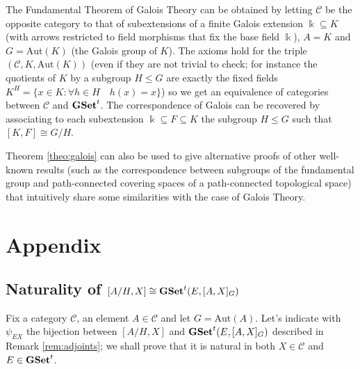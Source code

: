 \documentclass[italian, 12pt, reqno]{article}
\theoremstyle{myteo}
\numberwithin{equation}{section}
\newcommand{\cat}[1]{\mathscr{#1}}
\newcommand{\aut}{\text{Aut}}
\newcommand{\tgset}{\text{\textbf{GSet}}^t}
\newcommand{\homs}[2]{[#1, #2]}
\begin{document}
The Fundamental Theorem of Galois Theory can be obtained by letting \(\cat{C}\) be the opposite category to that of subextensions of a finite Galois extension \(\Bbbk \subseteq K\) (with arrows restricted to field morphisms that fix the base field \(\Bbbk\)), \(A = K\) and \(G = \text{Aut}(K)\) (the Galois group of \(K\)).
The axioms hold for the triple \((\cat{C}, K, \text{Aut}(K))\) (even if they are not trivial to check; for instance the quotients of \(K\) by a subgroup \(H \leq G\) are exactly the fixed fields \(K^H = \{x \in K : \forall h \in H\quad h(x) = x\}\)) so we get an equivalence of categories between \(\cat{C}\) and \(\tgset\).
The correspondence of Galois can be recovered by associating to each subextension \(\Bbbk \subseteq F \subseteq K\) the subgroup \(H \leq G\) such that \([K, F] \cong G/H\).

Theorem \ref{theo:galois} can also be used to give alternative proofs of other well-known results (such as the correspondence between subgroups of the fundamental group and path-connected covering spaces of a path-connected topological space) that intuitively share some similarities with the case of Galois Theory.

\section{Appendix}
\label{sec:appendixes}

\subsection{Naturality of \(\homs{A/H}{X} \cong \tgset(E, \homs{A}{X}_G)\)}
Fix a category \(\cat{C}\), an element \(A\in\cat{C}\) and let \(G = \aut(A)\).
Let's indicate with \(\psi_{EX}\) the bijection between \(\homs{A/H}{X}\) and \(\tgset(E, \homs{A}{X}_G)\) described in Remark \ref{rem:adjoints}; we shall prove that it is natural in both \(X\in\cat{C}\) and \(E\in\tgset\).
\end{document}
